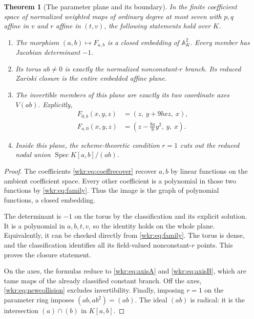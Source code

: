 \documentclass[11pt,a4paper]{article}
\numberwithin{equation}{section}
\newtheorem{theorem}{Theorem}[section]
\theoremstyle{definition}
\theoremstyle{remark}
\newcommand{\A}{\mathbb{A}}
\newcommand{\Spec}{\operatorname{Spec}}
\begin{document}
\begin{theorem}[The parameter plane and its boundary]\label{wkr:thm:plane}
In the finite coefficient space of normalized weighted maps of ordinary
degree at most seven with $p,q$ affine in $v$ and $r$ affine in $(t,v)$,
the following statements hold over $K$.
\begin{enumerate}[label=\textup{(\roman*)}]
\item The morphism $(a,b)\mapsto F_{a,b}$ is a closed embedding of
$\A^2_K$. Every member has Jacobian determinant $-1$.
\item Its torus $ab\ne0$ is exactly the normalized nonconstant-$r$ branch.
Its reduced Zariski closure is the entire embedded affine plane.
\item The invertible members of this plane are exactly its two coordinate
axes $V(ab)$. Explicitly,
\begin{align}
F_{0,b}(x,y,z)&=(z,\ y+9bxz,\ x),\label{wkr:eq:axisA}\\
F_{a,0}(x,y,z)&=\left(z-\frac{8a}{9}y^2,\ y,\ x\right).
\label{wkr:eq:axisB}
\end{align}
\item Inside this plane, the scheme-theoretic condition $r=1$ cuts out the
reduced nodal union $\Spec K[a,b]/(ab)$.
\end{enumerate}
\end{theorem}
\begin{proof}
The coefficients \eqref{wkr:eq:coeffrecover} recover $a,b$ by linear functions
on the ambient coefficient space. Every other coefficient is a polynomial
in those two functions by \eqref{wkr:eq:family}. Thus the image is the graph of
polynomial functions, a closed embedding.

The determinant is $-1$ on the torus by the classification and its explicit
solution. It is a polynomial in $a,b,t,v$, so the identity holds on the
whole plane. Equivalently, it can be checked directly from
\eqref{wkr:eq:family}. The torus is dense, and the classification identifies all
its field-valued nonconstant-$r$ points. This proves the closure statement.

On the axes, the formulas reduce to \eqref{wkr:eq:axisA} and \eqref{wkr:eq:axisB},
which are tame maps of the already classified constant branch. Off the
axes, \eqref{wkr:eq:newcollision} excludes invertibility. Finally, imposing
$r=1$ on the parameter ring imposes $(ab,ab^2)=(ab)$. The ideal $(ab)$ is
radical: it is the intersection $(a)\cap(b)$ in $K[a,b]$.
\end{proof}
\end{document}
